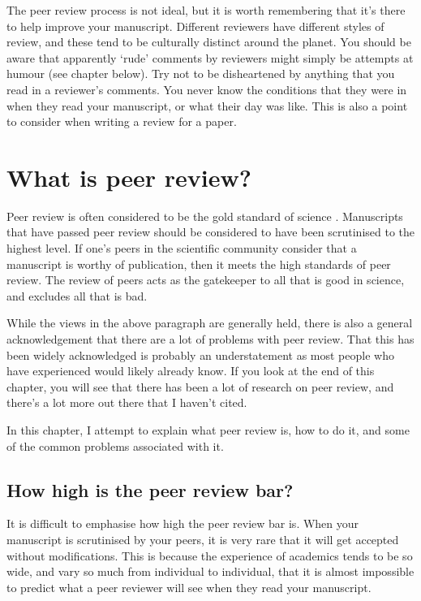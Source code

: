 \documentclass[
]{krantz}
\begin{document}
The peer review process is not ideal, but it is worth remembering that it's there to help improve your manuscript. Different reviewers have different styles of review, and these tend to be culturally distinct around the planet. You should be aware that apparently `rude' comments by reviewers might simply be attempts at humour (see chapter below). Try not to be disheartened by anything that you read in a reviewer's comments. You never know the conditions that they were in when they read your manuscript, or what their day was like. This is also a point to consider when writing a review for a paper.

\hypertarget{peerreview}{%
\chapter{What is peer review?}\label{peerreview}}

Peer review is often considered to be the gold standard of science \citep{mayden2012peer}. Manuscripts that have passed peer review should be considered to have been scrutinised to the highest level. If one's peers in the scientific community consider that a manuscript is worthy of publication, then it meets the high standards of peer review. The review of peers acts as the gatekeeper to all that is good in science, and excludes all that is bad.

While the views in the above paragraph are generally held, there is also a general acknowledgement that there are a lot of problems with peer review. That this has been widely acknowledged is probably an understatement as most people who have experienced would likely already know. If you look at the end of this chapter, you will see that there has been a lot of research on peer review, and there's a lot more out there that I haven't cited.

In this chapter, I attempt to explain what peer review is, how to do it, and some of the common problems associated with it.

\hypertarget{how-high-is-the-peer-review-bar}{%
\section{How high is the peer review bar?}\label{how-high-is-the-peer-review-bar}}

It is difficult to emphasise how high the peer review bar is. When your manuscript is scrutinised by your peers, it is very rare that it will get accepted without modifications. This is because the experience of academics tends to be so wide, and vary so much from individual to individual, that it is almost impossible to predict what a peer reviewer will see when they read your manuscript.
\end{document}
